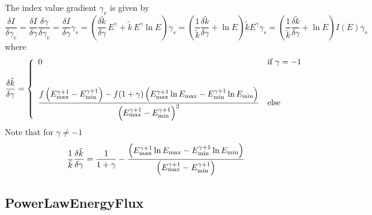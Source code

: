 \documentclass{article}[12pt,a4]
\begin{document}
The index value gradient $\gamma_v$ is given by
\begin{equation}
\frac{\delta I}{\delta \gamma_v} =
  \frac{\delta I}{\delta \gamma} \frac{\delta \gamma}{\delta \gamma_v} = 
  \frac{\delta I}{\delta \gamma} \gamma_s = 
  \left( \frac{\delta \tilde{k}}{\delta \gamma} \, E^{\gamma} + \tilde{k} \, E^{\gamma} \ln E \right)  \gamma_s =
  \left( \frac{1}{\tilde{k}} \frac{\delta \tilde{k}}{\delta \gamma} + \ln E \right) \tilde{k} E^{\gamma} \gamma_s =
  \left( \frac{1}{\tilde{k}} \frac{\delta \tilde{k}}{\delta \gamma} + \ln E \right) I(E) \gamma_s
\end{equation}
where
\begin{equation}
   \frac{\delta \tilde{k}}{\delta \gamma} = \left \{
   \begin{array}{l l}
     \displaystyle
     0 & \mbox{if $\gamma = -1$} \\
     \\
     \\
     \displaystyle
      \frac{f \left( E_{\rm max}^{\gamma+1}-E_{\rm min}^{\gamma+1} \right) -
              f (1+\gamma) \left( E_{\rm max}^{\gamma+1} \ln E_{\rm max} - 
                                      E_{\rm min}^{\gamma+1} \ln E_{\rm min} \right)}
              {\left( E_{\rm max}^{\gamma+1}-E_{\rm min}^{\gamma+1} \right)^2}
         & \mbox{else}
   \end{array}
   \right .
\end{equation}
Note that for $\gamma \ne -1$
\begin{equation}
\frac{1}{\tilde{k}} \frac{\delta \tilde{k}}{\delta \gamma} =
  \frac{1}{1+\gamma} -
  \frac{\left( E_{\rm max}^{\gamma+1} \ln E_{\rm max} - 
                    E_{\rm min}^{\gamma+1} \ln E_{\rm min} \right)}
          {\left( E_{\rm max}^{\gamma+1}-E_{\rm min}^{\gamma+1} \right)}
\end{equation}


\subsection{PowerLawEnergyFlux}
\end{document}
